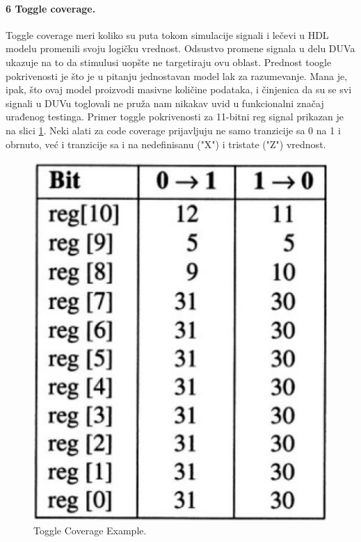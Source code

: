 \documentclass[a4paper, 12pt]{article}
\begin{document}
\paragraph{6 Toggle coverage.}
\hfill \break
\indent Toggle coverage meri koliko su puta tokom simulacije signali i lečevi u HDL modelu promenili svoju logičku vrednost. Odsustvo promene signala u delu DUVa ukazuje na to da stimulusi uopšte ne targetiraju ovu oblast. Prednost toogle pokrivenosti je što je u pitanju jednostavan model lak za razumevanje. Mana je, ipak, što ovaj model proizvodi masivne količine podataka, i činjenica da su se svi signali u DUVu toglovali ne pruža nam nikakav uvid u funkcionalni značaj urađenog testinga. Primer toggle pokrivenosti za 11-bitni reg signal prikazan je na slici \ref{img-p10-3}. Neki alati za code coverage prijavljuju ne samo tranzicije sa 0 na 1 i obrnuto, već i tranzicije sa i na nedefinisanu ("X") i tristate ("Z") vrednost.
\begin{figure}[h!]
\centering
\includegraphics[scale=0.4]{img-p10-3.png}
\caption{Toggle Coverage Example.}
\label{img-p10-3}
\end{figure}
\end{document}
